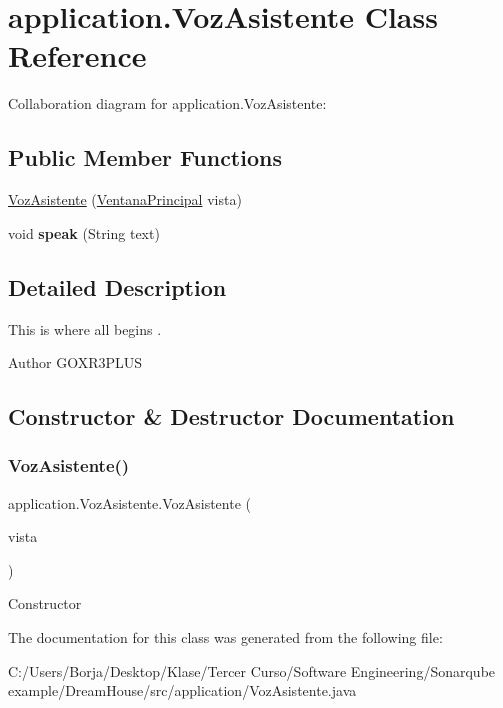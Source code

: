 \hypertarget{classapplication_1_1_voz_asistente}{}\section{application.\+Voz\+Asistente Class Reference}
\label{classapplication_1_1_voz_asistente}


Collaboration diagram for application.\+Voz\+Asistente\+:
\subsection*{Public Member Functions}
\begin{DoxyCompactItemize}
\item 
\mbox{\hyperlink{classapplication_1_1_voz_asistente_abbcb08ba9e4c065c9c40c2d0e554808b}{Voz\+Asistente}} (\mbox{\hyperlink{classvista_1_1_ventana_principal}{Ventana\+Principal}} vista)
\item 
\mbox{\label{classapplication_1_1_voz_asistente_adc472387531a7d0bdbb256278ab58828}} 
void {\bfseries speak} (String text)
\end{DoxyCompactItemize}


\subsection{Detailed Description}
This is where all begins .

\begin{DoxyAuthor}{Author}
G\+O\+X\+R3\+P\+L\+US 
\end{DoxyAuthor}


\subsection{Constructor \& Destructor Documentation}
\mbox{\label{classapplication_1_1_voz_asistente_abbcb08ba9e4c065c9c40c2d0e554808b}} 
\subsubsection{\texorpdfstring{Voz\+Asistente()}{VozAsistente()}}
{\footnotesize\ttfamily application.\+Voz\+Asistente.\+Voz\+Asistente (\begin{DoxyParamCaption}\item[{\mbox{\hyperlink{classvista_1_1_ventana_principal}{Ventana\+Principal}}}]{vista }\end{DoxyParamCaption})}

Constructor 

The documentation for this class was generated from the following file\+:\begin{DoxyCompactItemize}
\item 
C\+:/\+Users/\+Borja/\+Desktop/\+Klase/\+Tercer Curso/\+Software Engineering/\+Sonarqube example/\+Dream\+House/src/application/Voz\+Asistente.\+java\end{DoxyCompactItemize}
